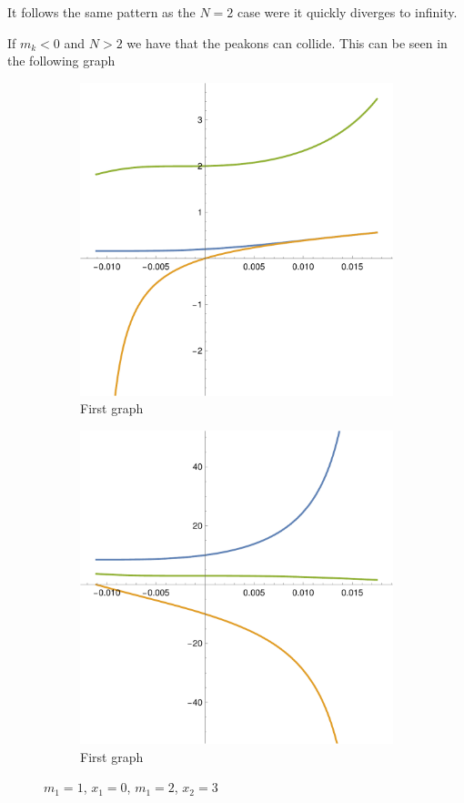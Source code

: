 \documentclass[english,master]{liumaiex}
\theoremstyle{plain}
\theoremstyle{definition}
\begin{document}
It follows the same pattern as the $N = 2$ case were it quickly diverges to infinity.

If $m_k < 0$ and $N > 2$ we have that the peakons can collide. This can be seen in the following graph
\begin{figure}[H]
	\begin{subfigure}{0.44\textwidth}
		\includegraphics[width=\textwidth]{graphs/3NCollision/x.pdf}
        \caption{First graph}
    \end{subfigure}
	\hfill
	\begin{subfigure}{0.44\textwidth}
		\includegraphics[width=\textwidth]{graphs/3NCollision/m.pdf}
        \caption{First graph}
    \end{subfigure}
    \caption{$m_1 = 1$, $x_1 = 0$, $m_1 = 2$, $x_2 = 3$}
\end{figure}
\end{document}
